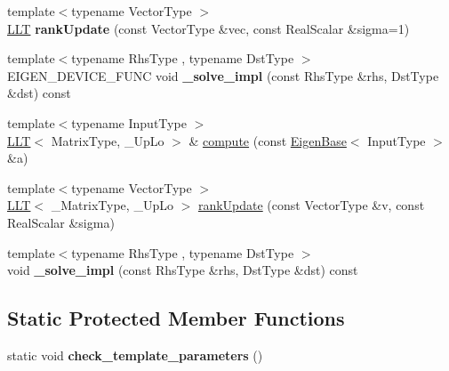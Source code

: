 \begin{DoxyCompactItemize}
\mbox{\label{class_eigen_1_1_l_l_t_aef5a3811432035d8389d6cbc8a13370a}} 
{\footnotesize template$<$typename Vector\+Type $>$ }\\\mbox{\hyperlink{class_eigen_1_1_l_l_t}{L\+LT}} {\bfseries rank\+Update} (const Vector\+Type \&vec, const Real\+Scalar \&sigma=1)
\item 
\mbox{\label{class_eigen_1_1_l_l_t_a4931c43521d00b110453da8d8f58f428}} 
{\footnotesize template$<$typename Rhs\+Type , typename Dst\+Type $>$ }\\E\+I\+G\+E\+N\+\_\+\+D\+E\+V\+I\+C\+E\+\_\+\+F\+U\+NC void {\bfseries \+\_\+solve\+\_\+impl} (const Rhs\+Type \&rhs, Dst\+Type \&dst) const
\item 
{\footnotesize template$<$typename Input\+Type $>$ }\\\mbox{\hyperlink{class_eigen_1_1_l_l_t}{L\+LT}}$<$ Matrix\+Type, \+\_\+\+Up\+Lo $>$ \& \mbox{\hyperlink{class_eigen_1_1_l_l_t_aecb45daf711328e0804f272131142b57}{compute}} (const \mbox{\hyperlink{struct_eigen_1_1_eigen_base}{Eigen\+Base}}$<$ Input\+Type $>$ \&a)
\item 
{\footnotesize template$<$typename Vector\+Type $>$ }\\\mbox{\hyperlink{class_eigen_1_1_l_l_t}{L\+LT}}$<$ \+\_\+\+Matrix\+Type, \+\_\+\+Up\+Lo $>$ \mbox{\hyperlink{class_eigen_1_1_l_l_t_aae1ee59cb3c46723721da6fd72acc21a}{rank\+Update}} (const Vector\+Type \&v, const Real\+Scalar \&sigma)
\item 
\mbox{\label{class_eigen_1_1_l_l_t_a3536d368add68acb7c9067da5656aaf9}} 
{\footnotesize template$<$typename Rhs\+Type , typename Dst\+Type $>$ }\\void {\bfseries \+\_\+solve\+\_\+impl} (const Rhs\+Type \&rhs, Dst\+Type \&dst) const
\end{DoxyCompactItemize}
\subsection*{Static Protected Member Functions}
\begin{DoxyCompactItemize}
\item 
\mbox{\label{class_eigen_1_1_l_l_t_a661ba945968e0b91357f8cdf72db09f8}} 
static void {\bfseries check\+\_\+template\+\_\+parameters} ()
\end{DoxyCompactItemize}
